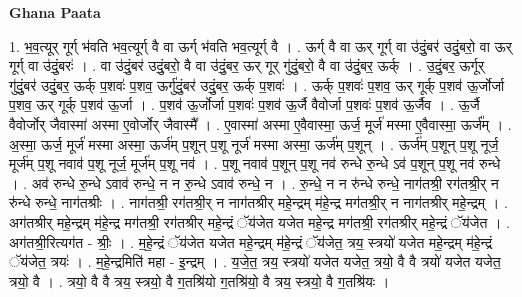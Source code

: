 \documentclass[17pt]{extarticle}
\begin{document}
\textbf{Ghana Paata } \newline

1. भ॒व॒त्यूर् गूर्ग् भ॑वति भव॒त्यूर्ग् वै वा ऊर्ग् भ॑वति भव॒त्यूर्ग् वै । . ऊर्ग् वै वा ऊर् गूर्ग् वा उ॑दुं॒बर॑ उदुं॒बरो॒ वा ऊर् गूर्ग् वा उ॑दुं॒बरः॑ । . वा उ॑दुं॒बर॑ उदुं॒बरो॒ वै वा उ॑दुं॒बर॒ ऊर् गूर् गु॑दुं॒बरो॒ वै वा उ॑दुं॒बर॒ ऊर्क् । . उ॒दुं॒बर॒ ऊर्गूर् गु॑दुं॒बर॑ उदुं॒बर॒ ऊर्क् प॒शवः॑ प॒शव॒ ऊर्गु॑दुं॒बर॑ उदुं॒बर॒ ऊर्क् प॒शवः॑ । . ऊर्क् प॒शवः॑ प॒शव॒ ऊर् गूर्क् प॒शव॑ ऊ॒र्जोर्जा प॒शव॒ ऊर् गूर्क् प॒शव॑ ऊ॒र्जा । . प॒शव॑ ऊ॒र्जोर्जा प॒शवः॑ प॒शव॑ ऊ॒र्जै वैवोर्जा प॒शवः॑ प॒शव॑ ऊ॒र्जैव । . ऊ॒र्जै वैवोर्जोर् जैवास्मा॑ अस्मा ए॒वोर्जोर् जैवास्मै᳚ । . ए॒वास्मा॑ अस्मा ए॒वैवास्मा॒ ऊर्ज॒ मूर्ज॑ मस्मा ए॒वैवास्मा॒ ऊर्ज᳚म् । . अ॒स्मा॒ ऊर्ज॒ मूर्ज॑ मस्मा अस्मा॒ ऊर्ज॑म् प॒शून् प॒शू नूर्ज॑ मस्मा अस्मा॒ ऊर्ज॑म् प॒शून् । . ऊर्ज॑म् प॒शून् प॒शू नूर्ज॒ मूर्ज॑म् प॒शू नवाव॑ प॒शू नूर्ज॒ मूर्ज॑म् प॒शू नव॑ । . प॒शू नवाव॑ प॒शून् प॒शू नव॑ रुन्धे रु॒न्धे ऽव॑ प॒शून् प॒शू नव॑ रुन्धे । . अव॑ रुन्धे रु॒न्धे ऽवाव॑ रुन्धे॒ न न रु॒न्धे ऽवाव॑ रुन्धे॒ न । . रु॒न्धे॒ न न रु॑न्धे रुन्धे॒ नाग॑तश्री॒ रग॑तश्री॒र् न रु॑न्धे रुन्धे॒ नाग॑तश्रीः । . नाग॑तश्री॒ रग॑तश्री॒र् न नाग॑तश्रीर् महे॒न्द्रम् म॑हे॒न्द्र मग॑तश्री॒र् न नाग॑तश्रीर् महे॒न्द्रम् । . अग॑तश्रीर् महे॒न्द्रम् म॑हे॒न्द्र मग॑तश्री॒ रग॑तश्रीर् महे॒न्द्रं ॅय॑जेत यजेत महे॒न्द्र मग॑तश्री॒ रग॑तश्रीर् महे॒न्द्रं ॅय॑जेत । . अग॑तश्री॒रित्यग॑त - श्रीः॒ । . म॒हे॒न्द्रं ॅय॑जेत यजेत महे॒न्द्रम् म॑हे॒न्द्रं ॅय॑जेत॒ त्रय॒ स्त्रयो॑ यजेत महे॒न्द्रम् म॑हे॒न्द्रं ॅय॑जेत॒ त्रयः॑ । . म॒हे॒न्द्रमिति॑ महा - इ॒न्द्रम् । . य॒जे॒त॒ त्रय॒ स्त्रयो॑ यजेत यजेत॒ त्रयो॒ वै वै त्रयो॑ यजेत यजेत॒ त्रयो॒ वै । . त्रयो॒ वै वै त्रय॒ स्त्रयो॒ वै ग॒तश्रि॑यो ग॒तश्रि॑यो॒ वै त्रय॒ स्त्रयो॒ वै ग॒तश्रि॑यः । \newline
\end{document}
